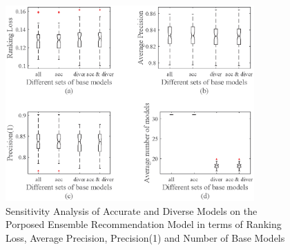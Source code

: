\documentclass[acmsmall]{acmart}
\begin{document}
\begin{figure}[!h]
	\centering
	\includegraphics[width=0.85\textwidth]{Figures/SensitiveAnalysis1}
	\caption{Sensitivity Analysis of Accurate and Diverse Models on the Porposed Ensemble Recommendation Model in terms of Ranking Loss, Average Precision, Precision(1) and Number of Base Models}\label{Fig:sensitiveAnalysis}
\end{figure}
\end{document}
